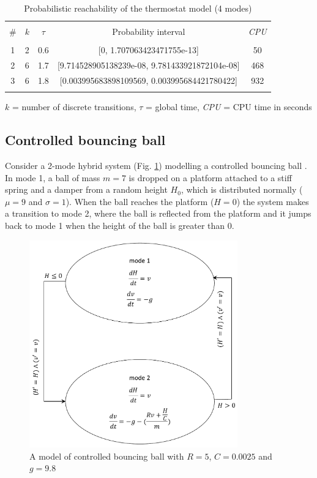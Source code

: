 \begin{table}[ht!] 
\caption{Probabilistic reachability of the thermostat model (4 modes)}
\centering
\begin{tabular}{c c c c c}
\hline\hline \\ [0.5ex]
\# & $k$ & $\tau$ & Probability interval & {\em CPU}\\ [0.5ex] 

\hline \\ [0.5ex]
1 & 2 & 0.6 & [0, 1.707063423471755e-13] & 50\\ [0.5ex]
2 & 6 & 1.7 & [9.714528905138239e-08, 9.781433921872104e-08] & 468\\ [0.5ex] 
3 & 6 & 1.8 & [0.003995683898109569, 0.003995684421780422] & 932\\ [0.5ex] 
\hline \\ [0.5ex]
\end{tabular} 
\label{table:thermostat-4m} 

$k$ = number of discrete transitions, $\tau$ = global time,
{\em CPU} = CPU time in seconds

\end{table}

\subsection{Controlled bouncing ball}
Consider a 2-mode hybrid system (Fig. \ref{fig:controlled-bouncing-ball}) modelling a controlled 
bouncing ball \cite{ADHS09}. In mode 1, a ball of mass $m = 7$ is dropped on a platform attached 
to a stiff spring and a damper from a random height $H_{0}$, which is distributed normally 
($\mu = 9$ and $\sigma = 1$). When the ball reaches the platform ($H = 0$) the system makes a 
transition to mode 2, where the ball is reflected from the platform and it jumps back to mode 1 
when the height of the ball is greater than 0.

\begin{figure}[ht!] 
\centering
\includegraphics[width=90mm]{controlled-bouncing-ball}
\caption{A model of controlled bouncing ball with $R = 5$, $C = 0.0025$ and $g = 9.8$}
\label{fig:controlled-bouncing-ball}
\end{figure}

